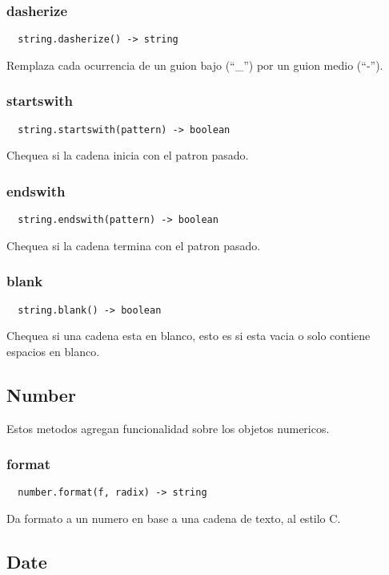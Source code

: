 \subsubsection*{dasherize}
\begin{verbatim}
  string.dasherize() -> string
\end{verbatim}
Remplaza cada ocurrencia de un guion bajo (``\_'') por un guion medio (``-'').

\subsubsection*{startswith}
\begin{verbatim}
  string.startswith(pattern) -> boolean
\end{verbatim}
Chequea si la cadena inicia con el patron pasado.

\subsubsection*{endswith}
\begin{verbatim}
  string.endswith(pattern) -> boolean
\end{verbatim}
Chequea si la cadena termina con el patron pasado.

\subsubsection*{blank}
\begin{verbatim}
  string.blank() -> boolean
\end{verbatim}
Chequea si una cadena esta en blanco, esto es si esta vacia o solo contiene
espacios en blanco.

\subsection{Number}
Estos metodos agregan funcionalidad sobre los objetos numericos.
\subsubsection*{format}
\begin{verbatim}
  number.format(f, radix) -> string
\end{verbatim}
Da formato a un numero en base a una cadena de texto, al estilo C.

\subsection{Date}
